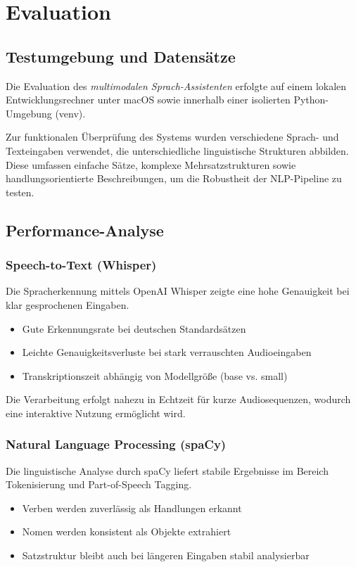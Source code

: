 \chapter{Evaluation}
\label{sec:evaluation}

\section{Testumgebung und Datensätze}
Die Evaluation des \textit{multimodalen Sprach-Assistenten} erfolgte auf einem lokalen Entwicklungsrechner unter macOS sowie innerhalb einer isolierten Python-Umgebung (venv).

Zur funktionalen Überprüfung des Systems wurden verschiedene Sprach- und Texteingaben verwendet, die unterschiedliche linguistische Strukturen abbilden. Diese umfassen einfache Sätze, komplexe Mehrsatzstrukturen sowie handlungsorientierte Beschreibungen, um die Robustheit der NLP-Pipeline zu testen.

\section{Performance-Analyse}

\subsection{Speech-to-Text (Whisper)}
Die Spracherkennung mittels OpenAI Whisper zeigte eine hohe Genauigkeit bei klar gesprochenen Eingaben.

\begin{itemize}
    \item Gute Erkennungsrate bei deutschen Standardsätzen
    \item Leichte Genauigkeitsverluste bei stark verrauschten Audioeingaben
    \item Transkriptionszeit abhängig von Modellgröße (base vs. small)
\end{itemize}

Die Verarbeitung erfolgt nahezu in Echtzeit für kurze Audiosequenzen, wodurch eine interaktive Nutzung ermöglicht wird.

\subsection{Natural Language Processing (spaCy)}
Die linguistische Analyse durch spaCy liefert stabile Ergebnisse im Bereich Tokenisierung und Part-of-Speech Tagging.

\begin{itemize}
    \item Verben werden zuverlässig als Handlungen erkannt
    \item Nomen werden konsistent als Objekte extrahiert
    \item Satzstruktur bleibt auch bei längeren Eingaben stabil analysierbar
\end{itemize}

